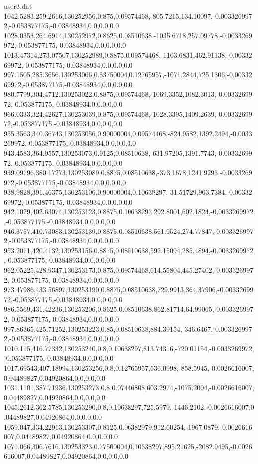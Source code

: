 \begin{filecontents}{user3.dat}
1042.5283,259.2616,130252956,0.875,0.09574468,-805.7215,134.10097,-0.0033269972,-0.053877175,-0.03848934,0.0,0.0,0.0
1028.0353,264.6914,130252972,0.8625,0.08510638,-1035.6718,257.09778,-0.0033269972,-0.053877175,-0.03848934,0.0,0.0,0.0
1013.47314,273.07507,130252989,0.8875,0.09574468,-1103.6831,462.91138,-0.0033269972,-0.053877175,-0.03848934,0.0,0.0,0.0
997.1505,285.3656,130253006,0.83750004,0.12765957,-1071.2844,725.1306,-0.0033269972,-0.053877175,-0.03848934,0.0,0.0,0.0
980.7799,304.4712,130253022,0.8875,0.09574468,-1069.3352,1082.3013,-0.0033269972,-0.053877175,-0.03848934,0.0,0.0,0.0
966.0333,324.42627,130253039,0.875,0.09574468,-1028.3395,1409.2639,-0.0033269972,-0.053877175,-0.03848934,0.0,0.0,0.0
955.3563,340.36743,130253056,0.90000004,0.09574468,-824.9582,1392.2494,-0.0033269972,-0.053877175,-0.03848934,0.0,0.0,0.0
943.4583,364.9557,130253073,0.9125,0.08510638,-631.97205,1391.7743,-0.0033269972,-0.053877175,-0.03848934,0.0,0.0,0.0
939.09796,380.17273,130253089,0.8875,0.08510638,-373.1678,1241.9293,-0.0033269972,-0.053877175,-0.03848934,0.0,0.0,0.0
938.9828,391.46375,130253106,0.90000004,0.10638297,-31.51729,903.7384,-0.0033269972,-0.053877175,-0.03848934,0.0,0.0,0.0
942.1029,402.63074,130253123,0.8875,0.10638297,292.8001,602.1824,-0.0033269972,-0.053877175,-0.03848934,0.0,0.0,0.0
946.3757,410.73083,130253139,0.8875,0.08510638,561.9524,274.77847,-0.0033269972,-0.053877175,-0.03848934,0.0,0.0,0.0
953.2071,420.4132,130253156,0.8875,0.08510638,592.15094,285.4894,-0.0033269972,-0.053877175,-0.03848934,0.0,0.0,0.0
962.05225,428.9347,130253173,0.875,0.09574468,614.55804,445.27402,-0.0033269972,-0.053877175,-0.03848934,0.0,0.0,0.0
973.47986,433.56897,130253190,0.8875,0.08510638,729.9913,364.37906,-0.0033269972,-0.053877175,-0.03848934,0.0,0.0,0.0
986.5569,431.42236,130253206,0.8625,0.08510638,862.81714,64.99065,-0.0033269972,-0.053877175,-0.03848934,0.0,0.0,0.0
997.86365,425.71252,130253223,0.85,0.08510638,884.39154,-346.6467,-0.0033269972,-0.053877175,-0.03848934,0.0,0.0,0.0
1010.115,416.77332,130253240,0.8,0.10638297,813.74316,-720.01154,-0.0033269972,-0.053877175,-0.03848934,0.0,0.0,0.0
1017.69543,407.18994,130253256,0.8,0.12765957,636.0998,-858.5945,-0.0026616007,0.04489827,0.04920864,0.0,0.0,0.0
1031.1101,387.71936,130253273,0.8,0.07446808,603.2974,-1075.2004,-0.0026616007,0.04489827,0.04920864,0.0,0.0,0.0
1045.2612,362.5785,130253290,0.8,0.10638297,725.5979,-1446.2102,-0.0026616007,0.04489827,0.04920864,0.0,0.0,0.0
1059.047,334.22913,130253307,0.8125,0.06382979,912.60254,-1967.0879,-0.0026616007,0.04489827,0.04920864,0.0,0.0,0.0
1071.066,306.7616,130253323,0.77500004,0.10638297,895.21625,-2082.9495,-0.0026616007,0.04489827,0.04920864,0.0,0.0,0.0

\end{filecontents}
